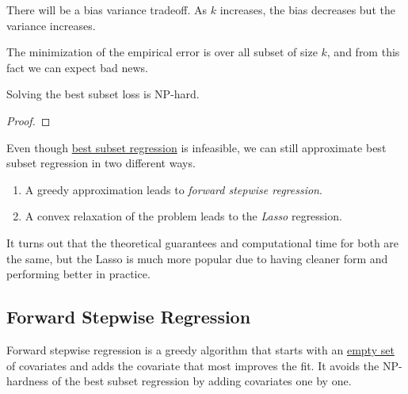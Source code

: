   There will be a bias variance tradeoff. As $k$ increases, the bias decreases but the variance increases. 

  The minimization of the empirical error is over all subset of size $k$, and from this fact we can expect bad news. 

  \begin{theorem}
    \label{thm:best-subset-regression-is-np-hard}
    Solving the best subset loss is NP-hard. 
  \end{theorem}
  \begin{proof}
    
  \end{proof}

  Even though \hyperref[def:best-subset-regression]{best subset regression} is infeasible, we can still approximate best subset regression in two different ways. 
  \begin{enumerate}
    \item A greedy approximation leads to \textit{forward stepwise regression}. 
    \item A convex relaxation of the problem leads to the \textit{Lasso} regression. 
  \end{enumerate}
  It turns out that the theoretical guarantees and computational time for both are the same, but the Lasso is much more popular due to having cleaner form and performing better in practice. 

\subsection{Forward Stepwise Regression} 

  Forward stepwise regression is a greedy algorithm that starts with an \hyperref[st-def:empty-set]{empty set} of covariates and adds the covariate that most improves the fit. It avoids the NP-hardness of the best subset regression by adding covariates one by one. 

